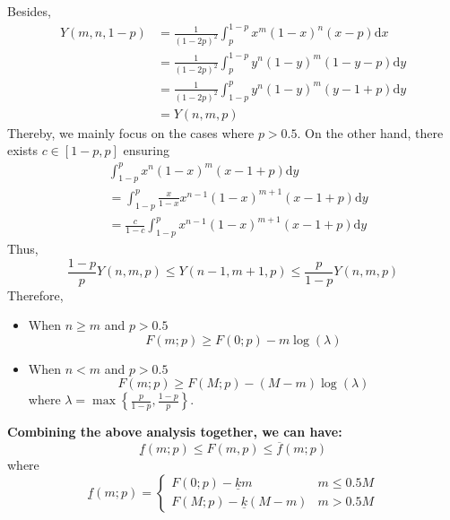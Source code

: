 \documentclass{article}
\begin{document}
Besides,
\begin{equation}
\begin{split}
Y(m,n, 1-p)&=\frac{1}{(1-2p)^2}\int_{p}^{1-p}x^m(1-x)^n(x-p)\mathrm{d}x\\
&=\frac{1}{(1-2p)^2}\int_{p}^{1-p}y^{n}(1-y)^{m}(1-y-p)\mathrm{d}y\\
&=\frac{1}{(1-2p)^2}\int_{1-p}^{p}y^{n}(1-y)^{m}(y-1+p)\mathrm{d}y\\
&=Y(n,m,p)
\end{split}
\end{equation}
Thereby, we mainly focus on the cases where $p>0.5$.
On the other hand, there exists $c\in [1-p, p]$ ensuring
\begin{equation}
\begin{split}
&\int_{1-p}^{p}x^{n}(1-x)^{m}(x-1+p)\mathrm{d}y\\
&=\int_{1-p}^{p}\frac{x}{1-x}x^{n-1}(1-x)^{m+1}(x-1+p)\mathrm{d}y\\
&=\frac{c}{1-c}\int_{1-p}^{p}x^{n-1}(1-x)^{m+1}(x-1+p)\mathrm{d}y
\end{split}
\end{equation}
Thus, 
\begin{equation}
\frac{1-p}{p}Y(n,m,p)\leq  Y(n-1,m+1, p) \leq \frac{p}{1-p}Y(n,m,p)
\end{equation}
Therefore,
\begin{itemize}
\item When $n\geq m$ and $p>0.5$
\begin{equation}
F(m;p)\geq F(0;p)-m\log(\lambda)
\end{equation}
\item When $n<m$ and $p>0.5$
\begin{equation}
F(m;p)\geq F(M;p)-(M-m)\log(\lambda)
\end{equation}
where $\lambda = \max \left\{\frac{p}{1-p},\frac{1-p}{p}\right\}$.
\end{itemize}
\textbf{\color{red} Combining the above analysis together, we can have:}
\begin{equation}
\underline{f}(m;p)\leq F(m,p) \leq \overline{f}(m;p)
\end{equation}
where
\begin{equation*}
\underline{f}(m;p)= \left\{
    \begin{array}{cl}
    F(0;p)-\underline{k} m & m\leq 0.5M\\
    F(M;p)-\underline{k}(M-m) & m>0.5M
    \end{array}\right.
\end{equation*}
\end{document}
